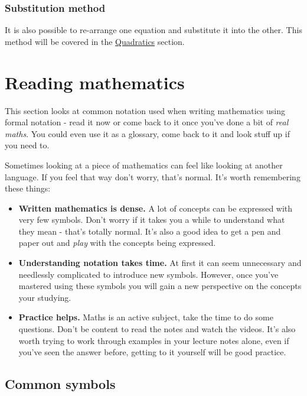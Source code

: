 \documentclass[
  a4paper,
]{scrbook}
\providecommand{\tightlist}{%
  \setlength{\itemsep}{0pt}\setlength{\parskip}{0pt}}
\begin{document}
\subsection{Substitution method}\label{substitution-method}

It is also possible to re-arrange one equation and substitute it into
the other. This method will be covered in the
\hyperref[07-quadratics.qmd]{Quadratics} section.


\chapter{Reading mathematics}\label{reading-mathematics}

This section looks at common notation used when writing mathematics
using formal notation - read it now or come back to it once you've done
a bit of \emph{real maths}. You could even use it as a glossary, come
back to it and look stuff up if you need to.

Sometimes looking at a piece of mathematics can feel like looking at
another language. If you feel that way don't worry, that's normal. It's
worth remembering these things:

\begin{itemize}
\tightlist
\item
  \textbf{Written mathematics is dense.} A lot of concepts can be
  expressed with very few symbols. Don't worry if it takes you a while
  to understand what they mean - that's totally normal. It's also a good
  idea to get a pen and paper out and \emph{play} with the concepts
  being expressed.
\item
  \textbf{Understanding notation takes time.} At first it can seem
  unnecessary and needlessly complicated to introduce new symbols.
  However, once you've mastered using these symbols you will gain a new
  perspective on the concepts your studying.
\item
  \textbf{Practice helps.} Maths is an active subject, take the time to
  do some questions. Don't be content to read the notes and watch the
  videos. It's also worth trying to work through examples in your
  lecture notes alone, even if you've seen the answer before, getting to
  it yourself will be good practice.
\end{itemize}

\section{Common symbols}\label{common-symbols}
\end{document}

